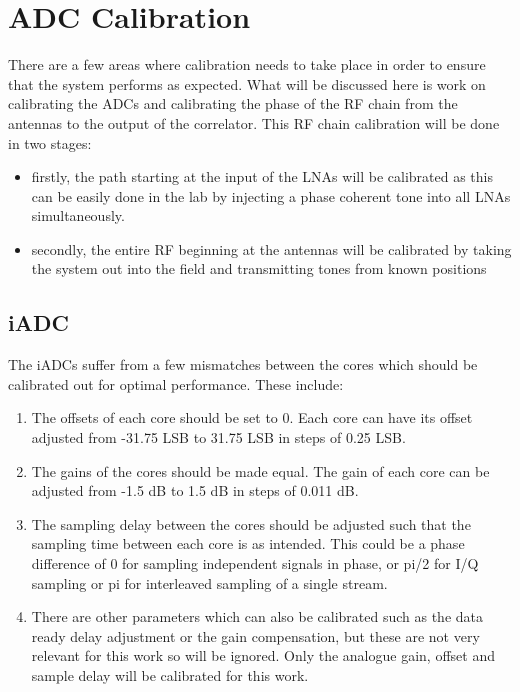 \chapter{ADC Calibration}
\graphicspath{{./img/adc-cal/}}
There are a few areas where calibration needs to take place in order to ensure that the system performs as expected. What will be discussed here is work on calibrating the ADCs and calibrating the phase of the RF chain from the antennas to the output of the correlator. This RF chain calibration will be done in two stages: 
\begin{itemize}
  \item firstly, the path starting at the input of the LNAs will be calibrated as this can be easily done in the lab by injecting a phase coherent tone into all LNAs simultaneously.
  \item secondly, the entire RF beginning at the antennas will be calibrated by taking the system out into the field and transmitting tones from known positions
\end{itemize}

\section{iADC}
The iADCs suffer from a few mismatches between the cores which should be calibrated out for optimal performance. These include:
\begin{enumerate}
  \item The offsets of each core should be set to 0. Each core can have its offset adjusted from -31.75 LSB to 31.75 LSB in steps of 0.25 LSB.
  \item The gains of the cores should be made equal. The gain of each core can be adjusted from -1.5 dB to 1.5 dB in steps of 0.011 dB. 
  \item The sampling delay between the cores should be adjusted such that the sampling time between each core is as intended. This could be a phase difference of 0 for sampling independent signals in phase, or pi/2 for I/Q sampling or pi for interleaved sampling of a single stream.
  \item There are other parameters which can also be calibrated such as the data ready delay adjustment or the gain compensation, but these are not very relevant for this work so will be ignored. Only the analogue gain, offset and sample delay will be calibrated for this work.
\end{enumerate}

